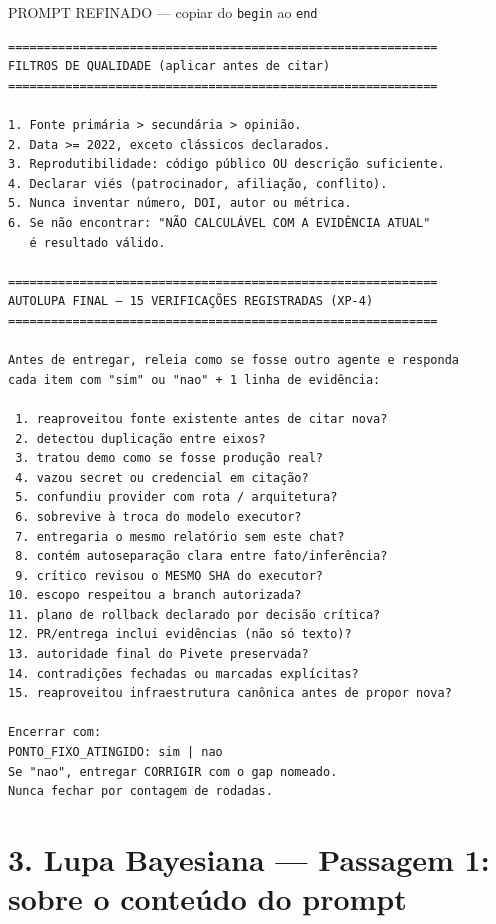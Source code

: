 \documentclass[11pt,a4paper]{article}
\begin{document}
\begin{bloco}{PROMPT REFINADO --- copiar do \texttt{begin} ao \texttt{end}}
\begin{verbatim}
============================================================
FILTROS DE QUALIDADE (aplicar antes de citar)
============================================================

1. Fonte primária > secundária > opinião.
2. Data >= 2022, exceto clássicos declarados.
3. Reprodutibilidade: código público OU descrição suficiente.
4. Declarar viés (patrocinador, afiliação, conflito).
5. Nunca inventar número, DOI, autor ou métrica.
6. Se não encontrar: "NÃO CALCULÁVEL COM A EVIDÊNCIA ATUAL"
   é resultado válido.

============================================================
AUTOLUPA FINAL — 15 VERIFICAÇÕES REGISTRADAS (XP-4)
============================================================

Antes de entregar, releia como se fosse outro agente e responda
cada item com "sim" ou "nao" + 1 linha de evidência:

 1. reaproveitou fonte existente antes de citar nova?
 2. detectou duplicação entre eixos?
 3. tratou demo como se fosse produção real?
 4. vazou secret ou credencial em citação?
 5. confundiu provider com rota / arquitetura?
 6. sobrevive à troca do modelo executor?
 7. entregaria o mesmo relatório sem este chat?
 8. contém autoseparação clara entre fato/inferência?
 9. crítico revisou o MESMO SHA do executor?
10. escopo respeitou a branch autorizada?
11. plano de rollback declarado por decisão crítica?
12. PR/entrega inclui evidências (não só texto)?
13. autoridade final do Pivete preservada?
14. contradições fechadas ou marcadas explícitas?
15. reaproveitou infraestrutura canônica antes de propor nova?

Encerrar com:
PONTO_FIXO_ATINGIDO: sim | nao
Se "nao", entregar CORRIGIR com o gap nomeado.
Nunca fechar por contagem de rodadas.
\end{verbatim}
\end{bloco}

\section*{3. Lupa Bayesiana --- Passagem 1: sobre o conteúdo do prompt}
\end{document}
